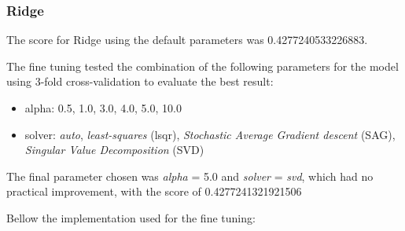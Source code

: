 \documentclass[11pt]{article}
\providecommand{\tightlist}{%
      \setlength{\itemsep}{0pt}\setlength{\parskip}{0pt}}
\begin{document}
\subsubsection{Ridge}

\hspace{0.5cm}The score for Ridge using the default parameters was 0.4277240533226883.

The fine tuning tested the combination of the following parameters for
the model using 3-fold cross-validation to evaluate the best result:

 \begin{itemize}
\tightlist
\item
  alpha: 0.5, 1.0, 3.0, 4.0, 5.0, 10.0
\item
  solver: \emph{auto}, \emph{least-squares} (lsqr), \emph{Stochastic
  Average Gradient descent} (SAG), \emph{Singular Value Decomposition}
  (SVD)
\end{itemize}

The final parameter chosen was \emph{alpha} = 5.0 and \emph{solver} =
\emph{svd}, which had no practical improvement, with the score of 0.4277241321921506

Bellow the implementation used for the fine tuning:
\end{document}
